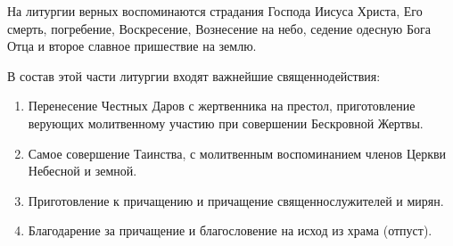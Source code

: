 На литургии верных воспоминаются страдания Господа Иисуса Христа, Его смерть, погребение, Воскресение, Вознесение на небо, седение одесную Бога Отца и второе славное пришествие на землю.

В состав этой части литургии входят важнейшие священнодействия:

\begin{enumerate}

\item Перенесение Честных Даров с жертвенника на престол, приготовление верующих молитвенному участию при совершении Бескровной Жертвы.

\item Самое совершение Таинства, с молитвенным воспоминанием членов Церкви Небесной и земной. 

\item Приготовление к причащению и причащение священнослужителей и мирян.

\item Благодарение за причащение и благословение на исход из храма (отпуст).

\end{enumerate}

